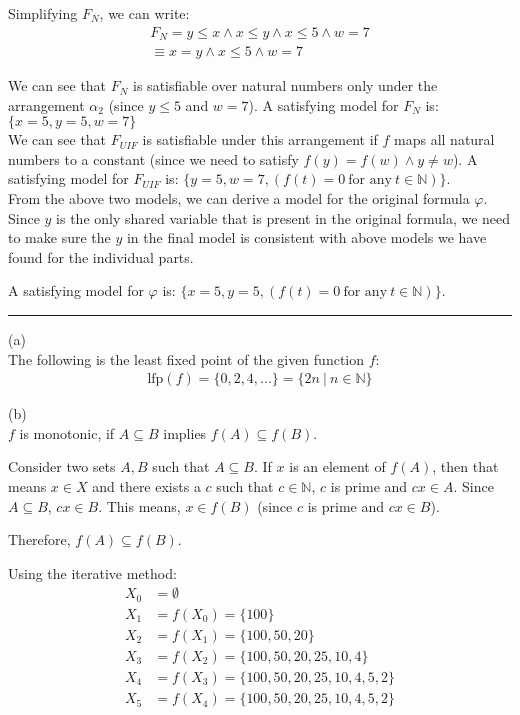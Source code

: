 \documentclass[12pt,letterpaper, onecolumn]{exam}
\begin{document}
\begin{questions}
	Simplifying $F_N$, we can write:
	\begin{align*}
		F_N = y \le x \land x \le y \land x \le 5 \land w = 7 \\
			\equiv x = y \land x \le 5 \land w = 7
	\end{align*}

	We can see that $F_N$ is satisfiable over natural numbers only under the arrangement $\alpha_2$ (since $y \le 5$ and $w=7$).
	A satisfying model for $F_N$ is:  $ \{x = 5, y = 5, w = 7\} $ \\

	We can see that $F_{UIF}$ is satisfiable under this arrangement if $f$ maps all natural numbers to a constant (since we need to satisfy
	$ f(y) = f(w) \land y \neq w $).
	A satisfying model for $F_{UIF}$ is: 
	$ \{y = 5, w = 7, (f(t) = 0 \: \text{for any} \: t \in \mathbb{N})\} $.  \\

	From the above two models, we can derive a model for the original formula $ \varphi $.
	Since $y$ is the only shared variable that is present in the original formula, we need to make sure the 
	$y$ in the final model is consistent with above models we have found for the individual parts.

	A satisfying model for $ \varphi $ is: $ \{x = 5, y = 5, (f(t) = 0 \: \text{for any} \: t \in \mathbb{N}) \} $.

    {\rule{17cm}{0.4pt}}

	\question[]
	\solutiontitle

	(a) \\
	The following is the least fixed point of the given function $f$:
	\begin{align*}
		\text{lfp}(f) = \{0, 2, 4, ...\} = \{2n \:|\: n \in \mathbb{N}\}
	\end{align*}

	(b) \\
	$f$ is monotonic, if $A \subseteq B$ implies $f(A) \subseteq f(B)$.

	Consider two sets $A, B$ such that $A \subseteq B$.
	If $x$ is an element of $f(A)$, then that means $x \in X$ and there exists a $c$ such that $c \in \mathbb{N}$, $c$ is prime and $cx \in A$.
	Since $A \subseteq B$, $cx \in B$.
	This means, $x \in f(B)$ (since $c$ is prime and $cx \in B$).

	Therefore, $f(A) \subseteq f(B)$.

	Using the iterative method:
	\begin{align*}
		X_0 &= \emptyset \\
		X_1 &= f(X_0) = \{100\} \\
		X_2 &= f(X_1) = \{ 100, 50, 20 \} \\
		X_3 &= f(X_2) = \{ 100, 50, 20, 25, 10, 4 \} \\
		X_4 &= f(X_3) = \{ 100, 50, 20, 25, 10, 4, 5, 2 \} \\
		X_5 &= f(X_4) = \{ 100, 50, 20, 25, 10, 4, 5, 2 \} 
	\end{align*}


\end{questions}
\end{document}
